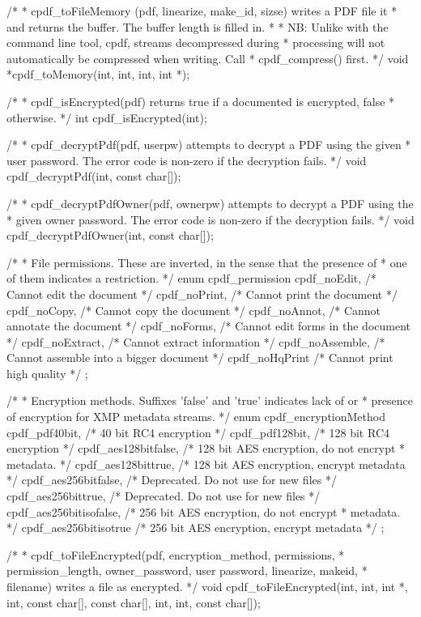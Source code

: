 /*
 * cpdf_toFileMemory (pdf, linearize, make_id, sizse) writes a PDF file it
 * and returns the buffer. The buffer length is filled in.
 *
 * NB: Unlike with the command line tool, cpdf, streams decompressed during
 * processing will not automatically be compressed when writing. Call
 * cpdf_compress() first.
 */
void *cpdf_toMemory(int, int, int, int *);

/*
 * cpdf_isEncrypted(pdf) returns true if a documented is encrypted, false
 * otherwise.
 */
int cpdf_isEncrypted(int);

/*
 * cpdf_decryptPdf(pdf, userpw) attempts to decrypt a PDF using the given
 * user password. The error code is non-zero if the decryption fails.
 */
void cpdf_decryptPdf(int, const char[]);

/*
 * cpdf_decryptPdfOwner(pdf, ownerpw) attempts to decrypt a PDF using the
 * given owner password. The error code is non-zero if the decryption fails.
 */
void cpdf_decryptPdfOwner(int, const char[]);

/*
 * File permissions. These are inverted, in the sense that the presence of
 * one of them indicates a restriction.
 */
enum cpdf_permission {
  cpdf_noEdit,     /* Cannot edit the document */
  cpdf_noPrint,    /* Cannot print the document */
  cpdf_noCopy,     /* Cannot copy the document */
  cpdf_noAnnot,    /* Cannot annotate the document */
  cpdf_noForms,    /* Cannot edit forms in the document */
  cpdf_noExtract,  /* Cannot extract information */
  cpdf_noAssemble, /* Cannot assemble into a bigger document */
  cpdf_noHqPrint   /* Cannot print high quality */
};

/*
 * Encryption methods. Suffixes 'false' and 'true' indicates lack of or
 * presence of encryption for XMP metadata streams.
 */
enum cpdf_encryptionMethod {
  cpdf_pdf40bit,          /* 40 bit RC4 encryption */
  cpdf_pdf128bit,         /* 128 bit RC4 encryption */
  cpdf_aes128bitfalse,    /* 128 bit AES encryption, do not encrypt
                           * metadata. */
  cpdf_aes128bittrue,     /* 128 bit AES encryption, encrypt metadata */
  cpdf_aes256bitfalse,    /* Deprecated. Do not use for new files */
  cpdf_aes256bittrue,     /* Deprecated. Do not use for new files */
  cpdf_aes256bitisofalse, /* 256 bit AES encryption, do not encrypt
                           * metadata. */
  cpdf_aes256bitisotrue   /* 256 bit AES encryption, encrypt metadata */
};

/*
 * cpdf_toFileEncrypted(pdf, encryption_method, permissions,
 * permission_length, owner_password, user password, linearize, makeid,
 * filename) writes a file as encrypted.
 */
void cpdf_toFileEncrypted(int, int, int *, int, const char[], const char[], int,
                          int, const char[]);

